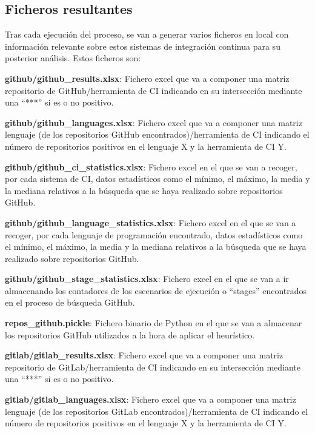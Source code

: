 \subsection{Ficheros resultantes}
Tras cada ejecución del proceso, se van a generar varios ficheros en local con información relevante sobre estos sistemas de integración continua para su posterior análisis. Estos ficheros son:
\begin{compactitem}
    \item \textbf{github/github\_results.xlsx}: Fichero excel que va a componer una matriz repositorio de GitHub/herramienta de CI indicando en su intersección mediante una ``***'' si es o no positivo.
    \item \textbf{github/github\_languages.xlsx}: Fichero excel que va a componer una matriz lenguaje (de los repositorios GitHub encontrados)/herramienta de CI indicando el número de repositorios positivos en el lenguaje X y la herramienta de CI Y.
    \item \textbf{github/github\_ci\_statistics.xlsx}: Fichero excel en el que se van a recoger, por cada sistema de CI, datos estadísticos como el mínimo, el máximo, la media y la mediana relativos a la búsqueda que se haya realizado sobre repositorios GitHub.
    \item \textbf{github/github\_language\_statistics.xlsx}: Fichero excel en el que se van a recoger, por cada lenguaje de programación encontrado, datos estadísticos como el mínimo, el máximo, la media y la mediana relativos a la búsqueda que se haya realizado sobre repositorios GitHub.
    \item \textbf{github/github\_stage\_statistics.xlsx}: Fichero excel en el que se van a ir almacenando los contadores de los escenarios de ejecución o ``stages'' encontrados en el proceso de búsqueda GitHub.
    \item \textbf{repos\_github.pickle}: Fichero binario de Python en el que se van a almacenar los repositorios GitHub utilizados a la hora de aplicar el heurístico.
    \item \textbf{gitlab/gitlab\_results.xlsx}: Fichero excel que va a componer una matriz repositorio de GitLab/herramienta de CI indicando en su intersección mediante una ``***'' si es o no positivo.
    \item \textbf{gitlab/gitlab\_languages.xlsx}: Fichero excel que va a componer una matriz lenguaje (de los repositorios GitLab encontrados)/herramienta de CI indicando el número de repositorios positivos en el lenguaje X y la herramienta de CI Y.

\end{compactitem}
